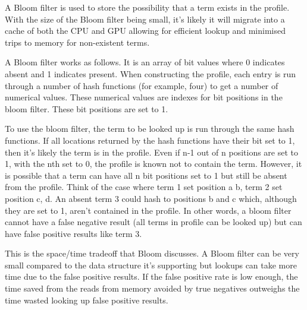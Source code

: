 A Bloom filter is used to store the possibility that a term exists in the
profile. With the size of the Bloom filter being small, it's likely it will
migrate into a cache of both the CPU and GPU allowing for efficient lookup and
minimised trips to memory for non-existent terms.

A Bloom filter works as follows. It is an array of bit values where 0 indicates
absent and 1 indicates present. When constructing the profile, each entry is
run through a number of hash functions (for example, four) to get a number of
numerical values. These numerical values are indexes for bit positions in the
bloom filter. These bit positions are set to 1.

To use the bloom filter, the term to be looked up is run through the same hash
functions. If all locations returned by the hash functions have their bit set to
1, then it's likely the term is in the profile. Even if n-1 out of n positions
are set to 1, with the nth set to 0, the profile is known not to contain the
term. However, it is possible that a term can have all n bit positions set to 1
but still be absent from the profile. Think of the case where term 1 set
position a b, term 2 set position c, d. An absent term 3 could hash to positions
b and c which, although they are set to 1, aren't contained in the profile. In
other words, a bloom filter cannot have a false negative result (all terms in
profile can be looked up) but can have false positive results like term 3.

This is the space/time tradeoff that Bloom discusses. A Bloom filter can be
very small compared to the data structure it's supporting but lookups can take
more time due to the false positive results. If the false positive rate is low
enough, the time saved from the reads from memory avoided by true negatives
outweighs the time wasted looking up false positive results.
